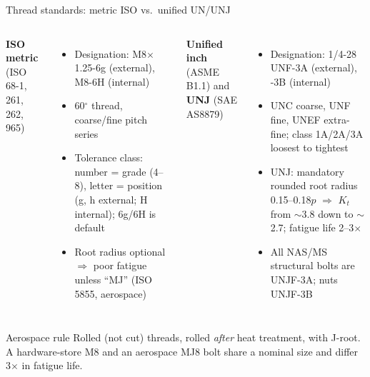 \documentclass[aspectratio=169,10pt]{beamer}
\begin{document}
\begin{frame}{Thread standards: metric ISO vs.\ unified UN/UNJ}
\footnotesize
\begin{columns}[T]
\textbf{ISO metric} (ISO 68-1, 261, 262, 965)
\begin{itemize}
  \item Designation: M8$\times$1.25-6g (external), M8-6H (internal)
  \item 60$^\circ$ thread, coarse/fine pitch series
  \item Tolerance class: number = grade (4--8), letter = position (g, h external; H internal); 6g/6H is default
  \item Root radius optional $\Rightarrow$ poor fatigue unless ``MJ'' (ISO 5855, aerospace)
\end{itemize}
\textbf{Unified inch} (ASME B1.1) and \textbf{UNJ} (SAE AS8879)
\begin{itemize}
  \item Designation: 1/4-28 UNF-3A (external), -3B (internal)
  \item UNC coarse, UNF fine, UNEF extra-fine; class 1A/2A/3A loosest to tightest
  \item \alert{UNJ}: mandatory rounded root radius 0.15--0.18$p$ $\Rightarrow$ $K_t$ from $\sim$3.8 down to $\sim$2.7; fatigue life 2--3$\times$
  \item All NAS/MS structural bolts are UNJF-3A; nuts UNJF-3B
\end{itemize}
\end{columns}
\vspace{4pt}
\begin{alertblock}{Aerospace rule}
Rolled (not cut) threads, rolled \emph{after} heat treatment, with J-root. A hardware-store M8 and an aerospace MJ8 bolt share a nominal size and differ 3$\times$ in fatigue life.
\end{alertblock}
\end{frame}
\end{document}
